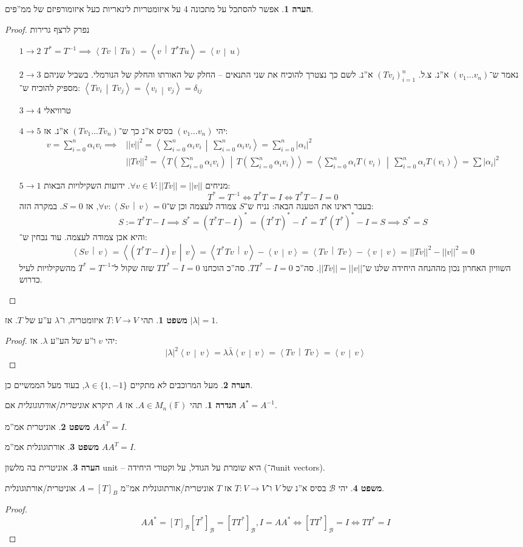 \documentclass[a4paper]{article}
\newcommand\bc    {\mathcal{B}}
\newcommand\ra    {\rangle}
\newcommand\la    {\langle}
\newcommand\ol    {\overline}
\newcommand\sumni     {\sum_{i = 0}^{n}}
\newcommand\F         {\mathbb{F}}
\newcommand\co        {\colon}
\newcommand\norm[1]   {\left \vert \left \vert #1 \right \vert \right \vert}
\newcommand\mut [2]   {\left \la #1 \,\middle|\, #2 \right \ra}
\newcommand\ag        {\alpha}
\newcommand\dg        {\delta}
\renewcommand\lg      {\lambda}
\newcommand\op    {^{-1}}
\newcommand\cl [1]    {\left ( #1 \right )}
\theoremstyle{definition}
\newtheorem{Theorem}{\color{myblue}משפט}
\newtheorem{Definition}{\color{mygreen}הגדרה}
\newtheorem{Remark}{\color{mycyan}הערה}
\newcommand\theo  [1] {\begin{Theorem}#1\end{Theorem}}
\newcommand\defi  [1] {\begin{Definition}#1\end{Definition}}
\newcommand\rmark [1] {\begin{Remark}#1\end{Remark}}
\begin{document}
	\rmark{אפשר להסתכל על מתכונה 4 על איזומטריות לינאריות כעל איזומורפיזם של ממ''פים. }
	
	\begin{proof}נפרק לרצף גרירות
		\begin{enumerate}
			\item[$1 \to 2$] \hfil $T^* = T\op \implies \mut{Tv}{Tu} = \mut{v}{T^*Tu} = \mut{v}{u}$
			\item[$2 \to 3$] נאמר ש־$(v_1 \dots v_n)$ א''נ. צ.ל. $(Tv_i)_{i = 1}^{n}$ א''נ. לשם כך נצטרך להוכיח את שני התנאים – החלק של האורתו והחלק של הנורמלי. בשביל שניהם מספיק להוכיח ש־: 
			$\mut{Tv_i}{Tv_j} = \mut{v_i}{v_j}  = \dg_{ij}$
			\item[$3 \to 4$]טרוויאלי
			\item[$4 \to 5$]יהי $(v_1 \dots v_n)$ בסיס א''נ כך ש־$(Tv_1 \dots Tv_n)$ א''נ. אז: 
			\begin{align*}
				v = \sumni \ag_i v_i \implies &\norm{v}^2 = \mut{\sumni \ag_i v_i}{\sumni \ag_i v_i} = \sumni |\ag_i|^2 \\
				&\norm{Tv}^2 = \mut{T\cl{\sumni \ag_i v_i}}{T\cl{\sumni \ag_i v_i}} = \mut{\sumni \ag_i T(v_i)}{\sumni \ag_i T(v_i)} = \sum |\ag_i|^2
			\end{align*}
			\item[$5 \to 1$]מניחים $\forall v \in V \co \norm{Tv} = \norm{v}$. ידועות השקילויות הבאות: 
			\[ T^* = T\op \iff T^*T = I \iff T^*T - I = 0 \]
			בעבר ראינו את הטענה הבאה: נניח ש־$S$ צמודה לעצמה וכן ש־$\forall v \co \mut{Sv}{v} = 0$, אז $S = 0$. במקרה הזה: 
			\[ S := T^*T - I \implies S^* = (T^*T - I)^* = (T^*T)^* - I^* = T^*(T^*)^* - I =S \implies S^* = S \]
			והיא אכן צמודה לעצמה. עוד נבחין ש־: 
			\[ \mut{Sv}{v} = \mut{(T^* T - I)v}{v} =\mut{T^*Tv}{v} - \mut{v}{v} = \mut{Tv}{Tv} - \mut{v}{v} = \norm{Tv}^2 - \norm{v}^2 = 0 \]
			השוויון האחרון נכון מההנחה היחידה שלנו ש־$\norm{Tv} = \norm{v}$. סה''כ $TT^* - I = 0$. סה''כ הוכחנו $TT^* - I = 0$ שזה שקול ל־$T^* = T\op$ מהשקילויות לעיל כדרוש. 
		\end{enumerate}
	\end{proof}
	
	\theo{תהי $T \co V \to V$ איזומטריה, ו־$\lg$ ע''ע של $T$. אז $|\lg| = 1$. } \begin{proof}
		יהי $v$ ו''ע של הע''ע $\lg$. אז: 
		\[ |\lg|^2 \mut{v}{v} = \lg\bar\lg \mut{v}{v} = \mut{Tv}{Tv} = \mut{v}{v} \]
	\end{proof}
	\rmark{מעל המרוכבים \textit{לא} מתקיים $\lg \in \{1, -1\}$, בעוד מעל הממשיים כן. }
	\defi{תהי $A \in M_n(\F)$. אז $A$ תיקרא \textit{אוניטרית}/\textit{אורתוגונלית} אם $A^* = A\op$. }
	\theo{אוניטרית אמ''מ $A\ol{A^T} = I$. }
	\theo{אורתוגונלית אמ''מ $AA^T = I$. }
	\rmark{אוניטרית בה מלשון unit – היא שומרת על הגודל, על וקטורי היחידה (ה־unit vectors). }
	\theo{יהי $\bc$ בסיס א''נ של $V$ ו־$T \co V \to V$ אז $T$ אוניטרית/אורתוגונלית אמ''מ $A = [T]_B$ אוניטרית/אורתוגונלית. }
	\begin{proof}
		\[ AA^* = [T]_\bc[T^*]_\bc = [TT^*]_\bc, I = AA^* \iff [TT^*]_\bc = I \iff TT^* = I \]
	\end{proof}
	
\end{document}
